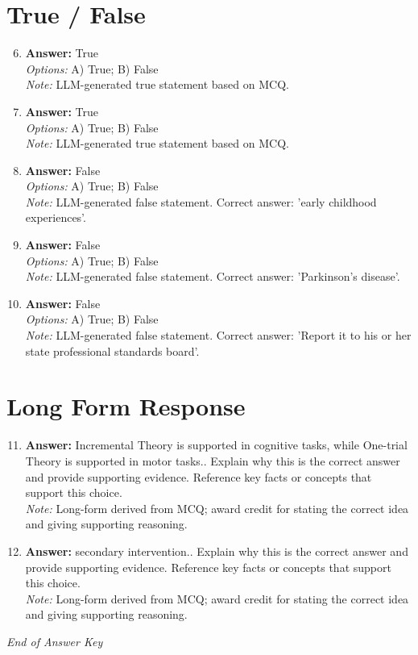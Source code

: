 \documentclass[12pt]{article}
\begin{document}
\section*{True / False}
\begin{enumerate}[label=\arabic*.]
\setcounter{enumi}{5}
\item \textbf{Answer:} True
\\ \textit{Options:} A) True; B) False
\\ \textit{Note:} LLM-generated true statement based on MCQ.
\item \textbf{Answer:} True
\\ \textit{Options:} A) True; B) False
\\ \textit{Note:} LLM-generated true statement based on MCQ.
\item \textbf{Answer:} False
\\ \textit{Options:} A) True; B) False
\\ \textit{Note:} LLM-generated false statement. Correct answer: 'early childhood experiences'.
\item \textbf{Answer:} False
\\ \textit{Options:} A) True; B) False
\\ \textit{Note:} LLM-generated false statement. Correct answer: 'Parkinson's disease'.
\item \textbf{Answer:} False
\\ \textit{Options:} A) True; B) False
\\ \textit{Note:} LLM-generated false statement. Correct answer: 'Report it to his or her state professional standards board'.
\end{enumerate}

\section*{Long Form Response}
\begin{enumerate}[label=\arabic*.]
\setcounter{enumi}{10}
\item \textbf{Answer:} Incremental Theory is supported in cognitive tasks, while One-trial Theory is supported in motor tasks.. Explain why this is the correct answer and provide supporting evidence. Reference key facts or concepts that support this choice.
\\ \textit{Note:} Long-form derived from MCQ; award credit for stating the correct idea and giving supporting reasoning.
\item \textbf{Answer:} secondary intervention.. Explain why this is the correct answer and provide supporting evidence. Reference key facts or concepts that support this choice.
\\ \textit{Note:} Long-form derived from MCQ; award credit for stating the correct idea and giving supporting reasoning.
\end{enumerate}

\vfill
\noindent\textit{End of Answer Key}
\end{document}
